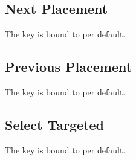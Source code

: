 \subsection{Next Placement}\label{subsec:controls_next placement}
The key is bound to
per default.

\subsection{Previous Placement}\label{subsec:controls_previous placement}
The key is bound to
per default.

\subsection{Select Targeted}\label{subsec:controls_select targeted}
The key is bound to
per default.

